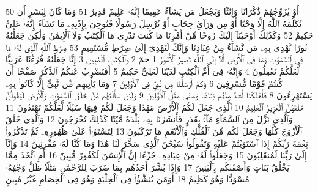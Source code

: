 {\tiny\colorbox{cl_aya}{50}} أَوْ يُزَوِّجُهُمْ ذُكْرَانًا وَإِنَٰثًا وَيَجْعَلُ مَن يَشَآءُ عَقِيمًا إِنَّهُۥ عَلِيمٌ قَدِيرٌ
{\tiny\colorbox{cl_aya}{51}} وَمَا كَانَ لِبَشَرٍ أَن يُكَلِّمَهُ ٱللَّهُ إِلَّا وَحْيًا أَوْ مِن وَرَآئِ حِجَابٍ أَوْ يُرْسِلَ رَسُولًا فَيُوحِىَ بِإِذْنِهِۦ مَا يَشَآءُ إِنَّهُۥ عَلِىٌّ حَكِيمٌ
{\tiny\colorbox{cl_aya}{52}} وَكَذَٰلِكَ أَوْحَيْنَآ إِلَيْكَ رُوحًا مِّنْ أَمْرِنَا مَا كُنتَ تَدْرِى مَا ٱلْكِتَٰبُ وَلَا ٱلْإِيمَٰنُ وَلَٰكِن جَعَلْنَٰهُ نُورًا نَّهْدِى بِهِۦ مَن نَّشَآءُ مِنْ عِبَادِنَا وَإِنَّكَ لَتَهْدِىٓ إِلَىٰ صِرَٰطٍ مُّسْتَقِيمٍ
{\tiny\colorbox{cl_aya}{53}} صِرَٰطِ ٱللَّهِ ٱلَّذِى لَهُۥ مَا فِى ٱلسَّمَٰوَٰتِ وَمَا فِى ٱلْأَرْضِ أَلَآ إِلَى ٱللَّهِ تَصِيرُ ٱلْأُمُورُ
{\tiny\colorbox{cl_aya}{1}} حمٓ
{\tiny\colorbox{cl_aya}{2}} وَٱلْكِتَٰبِ ٱلْمُبِينِ
{\tiny\colorbox{cl_aya}{3}} إِنَّا جَعَلْنَٰهُ قُرْءَٰنًا عَرَبِيًّا لَّعَلَّكُمْ تَعْقِلُونَ
{\tiny\colorbox{cl_aya}{4}} وَإِنَّهُۥ فِىٓ أُمِّ ٱلْكِتَٰبِ لَدَيْنَا لَعَلِىٌّ حَكِيمٌ
{\tiny\colorbox{cl_aya}{5}} أَفَنَضْرِبُ عَنكُمُ ٱلذِّكْرَ صَفْحًا أَن كُنتُمْ قَوْمًا مُّسْرِفِينَ
{\tiny\colorbox{cl_aya}{6}} وَكَمْ أَرْسَلْنَا مِن نَّبِىٍّ فِى ٱلْأَوَّلِينَ
{\tiny\colorbox{cl_aya}{7}} وَمَا يَأْتِيهِم مِّن نَّبِىٍّ إِلَّا كَانُوا۟ بِهِۦ يَسْتَهْزِءُونَ
{\tiny\colorbox{cl_aya}{8}} فَأَهْلَكْنَآ أَشَدَّ مِنْهُم بَطْشًا وَمَضَىٰ مَثَلُ ٱلْأَوَّلِينَ
{\tiny\colorbox{cl_aya}{9}} وَلَئِن سَأَلْتَهُم مَّنْ خَلَقَ ٱلسَّمَٰوَٰتِ وَٱلْأَرْضَ لَيَقُولُنَّ خَلَقَهُنَّ ٱلْعَزِيزُ ٱلْعَلِيمُ
{\tiny\colorbox{cl_aya}{10}} ٱلَّذِى جَعَلَ لَكُمُ ٱلْأَرْضَ مَهْدًا وَجَعَلَ لَكُمْ فِيهَا سُبُلًا لَّعَلَّكُمْ تَهْتَدُونَ
{\tiny\colorbox{cl_aya}{11}} وَٱلَّذِى نَزَّلَ مِنَ ٱلسَّمَآءِ مَآءًۢ بِقَدَرٍ فَأَنشَرْنَا بِهِۦ بَلْدَةً مَّيْتًا كَذَٰلِكَ تُخْرَجُونَ
{\tiny\colorbox{cl_aya}{12}} وَٱلَّذِى خَلَقَ ٱلْأَزْوَٰجَ كُلَّهَا وَجَعَلَ لَكُم مِّنَ ٱلْفُلْكِ وَٱلْأَنْعَٰمِ مَا تَرْكَبُونَ
{\tiny\colorbox{cl_aya}{13}} لِتَسْتَوُۥا۟ عَلَىٰ ظُهُورِهِۦ ثُمَّ تَذْكُرُوا۟ نِعْمَةَ رَبِّكُمْ إِذَا ٱسْتَوَيْتُمْ عَلَيْهِ وَتَقُولُوا۟ سُبْحَٰنَ ٱلَّذِى سَخَّرَ لَنَا هَٰذَا وَمَا كُنَّا لَهُۥ مُقْرِنِينَ
{\tiny\colorbox{cl_aya}{14}} وَإِنَّآ إِلَىٰ رَبِّنَا لَمُنقَلِبُونَ
{\tiny\colorbox{cl_aya}{15}} وَجَعَلُوا۟ لَهُۥ مِنْ عِبَادِهِۦ جُزْءًا إِنَّ ٱلْإِنسَٰنَ لَكَفُورٌ مُّبِينٌ
{\tiny\colorbox{cl_aya}{16}} أَمِ ٱتَّخَذَ مِمَّا يَخْلُقُ بَنَاتٍ وَأَصْفَىٰكُم بِٱلْبَنِينَ
{\tiny\colorbox{cl_aya}{17}} وَإِذَا بُشِّرَ أَحَدُهُم بِمَا ضَرَبَ لِلرَّحْمَٰنِ مَثَلًا ظَلَّ وَجْهُهُۥ مُسْوَدًّا وَهُوَ كَظِيمٌ
{\tiny\colorbox{cl_aya}{18}} أَوَمَن يُنَشَّؤُا۟ فِى ٱلْحِلْيَةِ وَهُوَ فِى ٱلْخِصَامِ غَيْرُ مُبِينٍ
